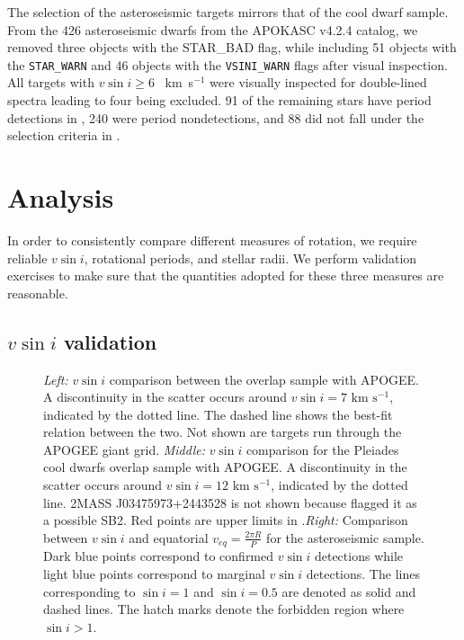 \documentclass[manuscript]{aastex6}
\newcommand{\vsini}{\ensuremath{v \sin i}}
\newcommand{\kms}{\textrm{~km~s}\ensuremath{^{-1}}}
\newcommand{\STARWARN}{\texttt{STAR\_WARN}}
\newcommand{\VSINIWARN}{\texttt{VSINI\_WARN}}
\begin{document}
The selection of the asteroseismic targets mirrors that of the cool dwarf
sample. From the 426 asteroseismic dwarfs from the APOKASC v4.2.4 catalog, we 
removed three objects with the STAR\_BAD flag, while including 51 objects with 
the \STARWARN{} and 46 objects with the \VSINIWARN{} flags after visual 
inspection. All targets with \(\vsini \ge 6\) \kms{} were visually
inspected for double-lined spectra leading to four being excluded. 91 of 
the remaining stars have period detections in \citet{McQuillan14}, 240 were 
period nondetections, and 88 did not fall under the selection criteria in 
\citet{McQuillan14}. 

\section{Analysis}
\label{sec:analysis}

In order to consistently compare different measures of rotation, we require 
reliable \vsini{}, rotational periods, and stellar radii. We perform validation
exercises to make sure that the quantities adopted for these three measures are 
reasonable.


\subsection{\vsini{} validation}
\label{sec:vsini_check}

\begin{figure*}
    \caption{\emph{Left:} \vsini{} comparison between the \citet{Bruntt12}
        overlap sample with APOGEE\@. A discontinuity in the scatter occurs
        around \(\vsini = 7 \kms\), indicated by the dotted line. The dashed
    line shows the best-fit relation between the two. Not shown are targets 
    run through the APOGEE giant grid. \emph{Middle:} \vsini{} comparison for 
    the Pleiades cool dwarfs \citep{Stauffer87} overlap sample with APOGEE\@. 
    A discontinuity in the scatter occurs around \(\vsini = 12 \kms\), 
    indicated by the dotted line. 2MASS J03475973+2443528 is not shown
    because \citet{Stauffer87} flagged it as a possible SB2. Red points are 
    upper limits in \citet{Stauffer87}.\emph{Right:} Comparison between
    \vsini{} and equatorial \(v_{eq} = \frac{2\pi R}{P}\) for the 
    asteroseismic sample. Dark blue points correspond to confirmed
    \vsini{} detections while light blue points correspond to marginal
    \vsini{} detections. The lines corresponding to \(\sin i = 1\) and
    \(\sin i = 0.5\) are denoted as solid and dashed lines. The hatch
    marks denote the forbidden region where \(\sin i > 1\).\label{fig:comps}}
\end{figure*}
\end{document}
